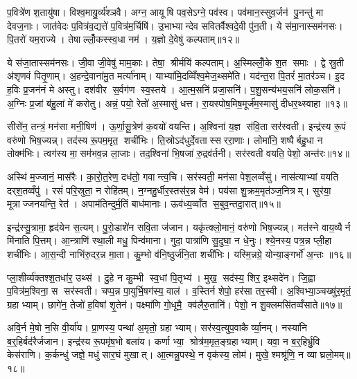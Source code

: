 प॒वित्रे॑ण श॒तायु॑षा। विश्व॒मायु॒र्व्य॑श्ञवै। अग्न॒ आयूषि पव॒सेऽग्ने॒ पव॑स्व। पव॑मान॒स्सुव॒र्जन॑ पु॒नन्तु॑ मा देवज॒नाः। जात॑वेदः प॒वित्र॑व॒द्यत्ते॑ प॒वित्र॑म॒र्चिषि॑। उ॒भाभ्यान्देव सवितर्वैश्वदे॒वी पु॑न॒ती। ये स॑मा॒नास्सम॑नसः। पि॒तरो॑ यम॒राज्ये। तेषाल्लोँ॒कस्स्व॒धा नम॑। य॒ज्ञो दे॒वेषु॑ कल्पताम्॥१२॥

ये स॑जा॒तास्सम॑नसः। जी॒वा जी॒वेषु॑ माम॒काः। तेषा॒ श्रीर्मयि॑ कल्पताम्। अ॒स्मिल्लोँ॒के श॒त समाः। द्वे स्रु॒ती अ॑शृणवं पितृ॒णाम्। अ॒हन्दे॒वाना॑मु॒त मर्त्या॑नाम्। याभ्या॑मि॒दव्विँश्व॒मेज॒थ्समे॑ति। यद॑न्त॒रा पि॒तरं॑ मा॒तर॑ञ्च। इ॒द ह॒विः प्र॒जन॑नं मे अस्तु। दश॑वीर स॒र्वग॑ण स्व॒स्तये। आ॒त्म॒सनि॑ प्रजा॒सनि॑। प॒शु॒सन्य॑भय॒सनि॑ लोक॒सनि॑। अ॒ग्निः प्र॒जां ब॑हु॒लां मे॑ करोतु। अन्नं॒ पयो॒ रेतो॑ अ॒स्मासु॑ धत्त। रा॒यस्पोष॒मिष॒मूर्ज॑म॒स्मासु॑ दीधर॒थ्स्वाहा॥१३॥\anuvakamend[इ॒न्द्रि॒याय॑ पि॒तर॑श्श॒तायु॑षा पु॒नन्तु॑ मा पिताम॒हाः पु॒नन्तु॒ प्रपि॑तामहाः कल्पता स्व॒स्तये॒ पञ्च॑ च]

सीसे॑न॒ तन्त्रं॒ मन॑सा मनी॒षिण॑। ऊ॒र्णा॒सू॒त्रेण॑ क॒वयो॑ वयन्ति। अ॒श्विना॑ य॒ज्ञ स॑वि॒ता सर॑स्वती। इन्द्र॑स्य रू॒पं वरु॑णो भिष॒ज्यन्न्। तद॑स्य रू॒पम॒मृत॒ शची॑भिः। ति॒स्रोऽद॑धुर्दे॒वतास्सररा॒णाः। लोमा॑नि॒ शष्पैर्बहु॒धा न तोक्म॑भिः। त्वग॑स्य मा॒सम॑भव॒न्न ला॒जाः। तद॒श्विना॑ भि॒षजा॑ रु॒द्रव॑र्तनी। सर॑स्वती वयति॒ पेशो॒ अन्त॑रः॥१४॥

अस्थि॑ म॒ज्जानं॒ मास॑रैः। का॒रो॒त॒रेण॒ दध॑तो॒ गवान्त्व॒चि। सर॑स्वती॒ मन॑सा पेश॒लव्वँसु॑। नास॑त्याभ्यां वयति दर्‌श॒तव्वँपु॑। रसं॑ परि॒स्रुता॒ न रोहि॑तम्। न॒ग्नहु॒र्धीर॒स्तस॑र॒न्न वेम॑। पय॑सा शु॒क्रम॒मृत॑ञ्ज॒नित्रम्। सुर॑या॒ मूत्राज्जनयन्ति॒ रेत॑। अपाम॑तिन्दुर्म॒तिं बाध॑मानाः। ऊव॑ध्य॒व्वाँत स॒बुव॒न्तदा॒रात्॥१५॥

इन्द्र॑स्सु॒त्रामा॒ हृद॑येन स॒त्यम्। पु॒रो॒डाशे॑न सवि॒ता ज॑जान। यकृ॑त्क्लो॒मानं॒ वरु॑णो भिष॒ज्यन्न्। मत॑स्ने वाय॒व्यैर्न मि॑नाति पि॒त्तम्। आ॒न्त्राणि॑ स्था॒ली मधु॒ पिन्व॑माना। गुदा॒ पात्रा॑णि सु॒दुघा॒ न धे॒नुः। श्ये॒नस्य॒ पत्र॒न्न प्ली॒हा शची॑भिः। आ॒स॒न्दी नाभि॑रु॒दर॒न्न मा॒ता। कु॒म्भो व॑नि॒ष्ठुर्ज॑नि॒ता शची॑भिः। यस्मि॒न्नग्रे॒ योन्या॒ङ्गर्भो॑ अ॒न्तः ॥१६॥

प्ला॒शीर्व्य॑क्तश्श॒तधा॑र॒ उथ्स॑। दु॒हे न कु॒म्भी स्व॒धां पि॒तृभ्य॑। मुख॒ सद॑स्य॒ शिर॒ इथ्सदे॑न। जि॒ह्वा प॒वित्र॑म॒श्विना॒ स सर॑स्वती। चप्प॒न्न पा॒युर्भि॒षग॑स्य॒ वाल॑। व॒स्तिर्न शेपो॒ हर॑सा तर॒स्वी। अ॒श्विभ्या॒ञ्चख्षु॑र॒मृतं॒ ग्रहाभ्याम्। छागे॑न॒ तेजो॑ ह॒विषा॑ शृ॒तेन॑। पक्ष्मा॑णि गो॒धूमै॒ क्व॑लैरु॒तानि॑। पेशो॒ न शु॒क्लमसि॑तव्वँसाते॥१७॥

अवि॒र्न मे॒षो न॒सि वी॒र्या॑य। प्रा॒णस्य॒ पन्था॑ अ॒मृतो॒ ग्रहाभ्याम्। सर॑स्व॒त्युप॒वाकैर्व्या॒नम्। नस्या॑नि ब॒र्॒हिर्बद॑रैर्जजान। इन्द्र॑स्य रू॒पमृ॑ष॒भो बला॑य। कर्णाभ्या॒ श्रोत्र॑म॒मृत॒ङ्ग्रहाभ्याम्। यवा॒ न ब॒र्॒हिर्भ्रु॒वि केस॑राणि। क॒र्कन्धु॑ जज्ञे॒ मधु॑ सार॒घं मुखात्। आ॒त्मन्नु॒पस्थे॒ न वृक॑स्य॒ लोम॑। मुखे॒ श्मश्रू॑णि॒ न व्याघ्रलो॒मम्॥१८॥

